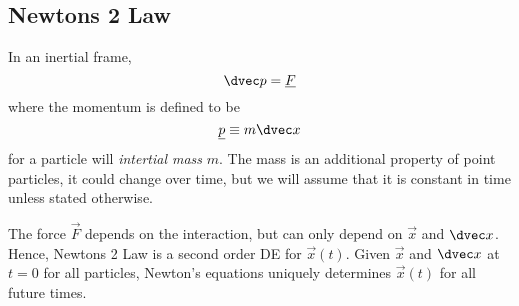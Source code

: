\documentclass{article}
\numberwithin{equation}{section}
\begin{document}
\subsection{Newtons 2 Law}
In an inertial frame,
\[\dvec p = \vec F\]
where the momentum is defined to be
\[\vec p \equiv m \dvec x\]
for a particle will \emph{intertial mass} $m$. 
The mass is an additional property of point particles, it could change over time, but we will assume that it is constant in time unless stated otherwise.

The force $\vec F$ depends on the interaction, but can only depend on $\vec x$ and $\dvec x$.
Hence, Newtons 2 Law is a second order DE for $\vec x(t)$.
Given $\vec x$ and $\dvec x$ at $t = 0$ for all particles, Newton's equations uniquely determines $\vec x(t)$ for all future times.
\end{document}

